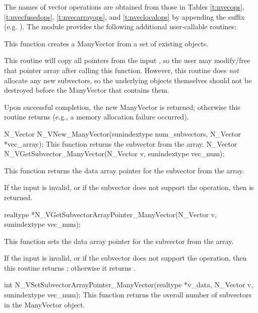 The names of vector operations are obtained from those in Tables
\ref{t:nvecops}, \ref{t:nvecfusedops}, \ref{t:nvecarrayops}, and
\ref{t:nveclocalops} by appending the suffix  
(e.g. ).
The module {\nvecmanyvector} provides the following additional
user-callable routines:
{
  This function creates a ManyVector from a set of existing {\nvector}
  objects.

  This routine will copy all  pointers from the input
  , so the user may modify/free that pointer array
  after calling this function.  However, this routine does \emph{not}
  allocate any new subvectors, so the underlying {\nvector} objects
  themselves should not be destroyed before the ManyVector that
  contains them.

  Upon successful completion, the new ManyVector is returned;
  otherwise this routine returns  (e.g., a memory allocation
  failure occurred).
}
{
  N\_Vector N\_VNew\_ManyVector(sunindextype num\_subvectors,
  N\_Vector *vec\_array);
}
{
  This function returns the  subvector from the {\nvector}
  array.
}
{
  N\_Vector N\_VGetSubvector\_ManyVector(N\_Vector v, sunindextype vec\_num);
}
{
  This function returns the data array pointer for the 
  subvector from the {\nvector} array.

  If the input  is invalid, or if the subvector does not
  support the  operation, then  is returned.
}
{
  realtype *N\_VGetSubvectorArrayPointer\_ManyVector(N\_Vector v, sunindextype vec\_num);
}
{
  This function sets the data array pointer for the 
  subvector from the {\nvector} array.

  If the input  is invalid, or if the subvector does not
  support the  operation, then this routine
  returns ; otherwise it returns .
}
{
  int N\_VSetSubvectorArrayPointer\_ManyVector(realtype *v\_data, N\_Vector v, sunindextype vec\_num);
}
{
  This function returns the overall number of subvectors in the
  ManyVector object.
}
